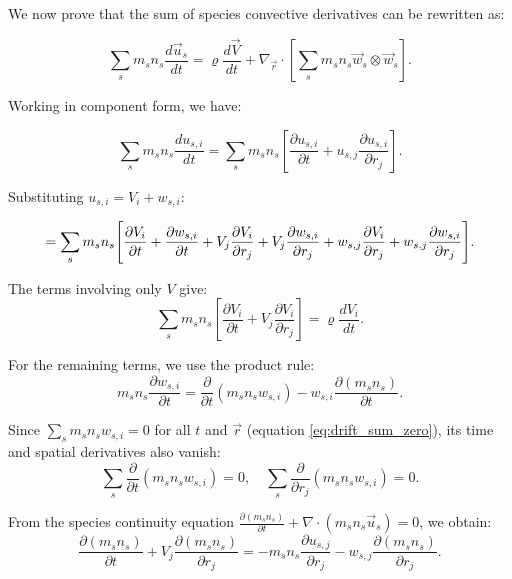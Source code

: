 We now prove that the sum of species convective derivatives can be rewritten as:

\begin{equation}
\sum_s m_s n_s \frac{d\vec{u}_s}{dt} = \varrho \frac{d\vec{V}}{dt} + \nabla_{\vec{r}} \cdot \left[\sum_s m_s n_s \vec{w}_s \otimes \vec{w}_s\right].
\label{eq:key_identity}
\end{equation}


Working in component form, we have:

\begin{equation*}
\sum_s m_s n_s \frac{du_{s,i}}{dt} = \sum_s m_s n_s \left[\frac{\partial u_{s,i}}{\partial t} + u_{s,j} \frac{\partial u_{s,i}}{\partial r_j}\right].
\end{equation*}

Substituting $u_{s,i} = V_i + w_{s,i}$:

\begin{equation*}
= \sum_s m_s n_s \Bigg[\frac{\partial V_i}{\partial t} + \frac{\partial w_{s,i}}{\partial t} + V_j \frac{\partial V_i}{\partial r_j} + V_j \frac{\partial w_{s,i}}{\partial r_j} \\
+ w_{s,j} \frac{\partial V_i}{\partial r_j} + w_{s,j} \frac{\partial w_{s,i}}{\partial r_j}\Bigg].
\end{equation*}

The terms involving only $V$ give:
\begin{equation*}
\sum_s m_s n_s \left[\frac{\partial V_i}{\partial t} + V_j \frac{\partial V_i}{\partial r_j}\right] = \varrho \frac{dV_i}{dt}.
\end{equation*}

For the remaining terms, we use the product rule:
\begin{equation*}
m_s n_s \frac{\partial w_{s,i}}{\partial t} = \frac{\partial}{\partial t}(m_s n_s w_{s,i}) - w_{s,i} \frac{\partial (m_s n_s)}{\partial t}.
\end{equation*}

Since $\sum_s m_s n_s w_{s,i} = 0$ for all $t$ and $\vec{r}$ (equation \ref{eq:drift_sum_zero}), its time and spatial derivatives also vanish:
\begin{equation*}
\sum_s \frac{\partial}{\partial t}(m_s n_s w_{s,i}) = 0, \quad \sum_s \frac{\partial}{\partial r_j}(m_s n_s w_{s,i}) = 0.
\end{equation*}

From the species continuity equation $\frac{\partial (m_s n_s)}{\partial t} + \nabla \cdot (m_s n_s \vec{u}_s) = 0$, we obtain:
\begin{equation*}
\frac{\partial (m_s n_s)}{\partial t} + V_j \frac{\partial (m_s n_s)}{\partial r_j} = -m_s n_s \frac{\partial u_{s,j}}{\partial r_j} - w_{s,j} \frac{\partial (m_s n_s)}{\partial r_j}.
\end{equation*}

